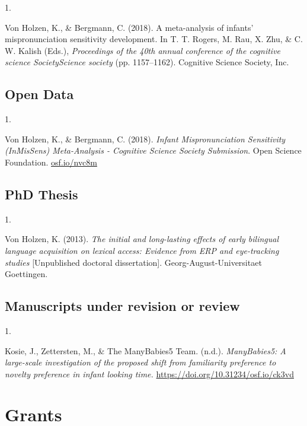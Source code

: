 \documentclass[10pt,a4paper,]{article}
\newlength{\cslhangindent}
\newlength{\csllabelwidth}
\newcommand{\CSLLeftMargin}[1]{\parbox[t]{\csllabelwidth}{\hfill #1~}}
\newcommand{\CSLRightInline}[1]{\parbox[t]{\linewidth - \cslhangindent - \csllabelwidth}{#1}\vspace{0.8ex}}
\begin{document}
\hypertarget{bibliography}{}
\leavevmode{}%
\CSLLeftMargin{1. }%
\CSLRightInline{Von Holzen, K., \& Bergmann, C. (2018). A meta-analysis
of infants' mispronunciation sensitivity development. In T. T. Rogers,
M. Rau, X. Zhu, \& C. W. Kalish (Eds.), \emph{Proceedings of the 40th
annual conference of the cognitive science SocietyScience society} (pp.
1157--1162). Cognitive Science Society, Inc.}

\hypertarget{open-data}{%
\subsection{Open Data}\label{open-data}}

\hypertarget{bibliography}{}
\leavevmode{}%
\CSLLeftMargin{1. }%
\CSLRightInline{Von Holzen, K., \& Bergmann, C. (2018). \emph{Infant
Mispronunciation Sensitivity (InMisSens) Meta-Analysis - Cognitive
Science Society Submission}. Open Science Foundation.
\href{https://osf.io/nvc8m}{osf.io/nvc8m}}

\hypertarget{phd-thesis}{%
\subsection{PhD Thesis}\label{phd-thesis}}

\hypertarget{bibliography}{}
\leavevmode{}%
\CSLLeftMargin{1. }%
\CSLRightInline{Von Holzen, K. (2013). \emph{The initial and
long-lasting effects of early bilingual language acquisition on lexical
access: Evidence from ERP and eye-tracking studies} {[}Unpublished
doctoral dissertation{]}. Georg-August-Universitaet Goettingen.}

\hypertarget{manuscripts-under-revision-or-review}{%
\subsection{Manuscripts under revision or
review}\label{manuscripts-under-revision-or-review}}

\hypertarget{bibliography}{}
\leavevmode{}%
\CSLLeftMargin{1. }%
\CSLRightInline{Kosie, J., Zettersten, M., \& The ManyBabies5 Team.
(n.d.). \emph{ManyBabies5: A large-scale investigation of the proposed
shift from familiarity preference to novelty preference in infant
looking time.} \url{https://doi.org/10.31234/osf.io/ck3vd}}

\hypertarget{grants}{%
\section{Grants}\label{grants}}
\end{document}
